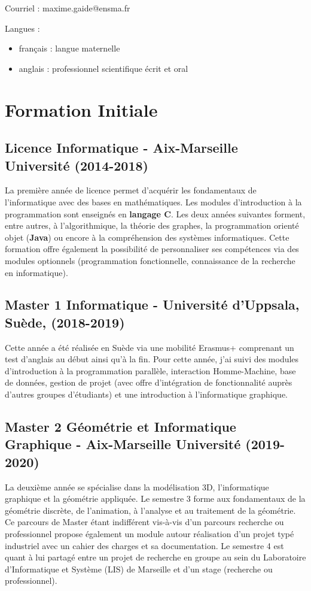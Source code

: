 \documentclass[11pt,a4paper,oneside]{article}
\begin{document}
\noindent Courriel : maxime.gaide@ensma.fr

\noindent Langues :
\begin{itemize}
	\item français : langue maternelle
	\item anglais : professionnel scientifique écrit et oral
\end{itemize}

\section{Formation Initiale}

\subsection{Licence Informatique - Aix-Marseille Université (2014-2018)}

La première année de licence permet d'acquérir les fondamentaux de
l'informatique avec des bases en mathématiques. %
Les modules d'introduction à la programmation sont enseignés en \textbf{langage C}. %
Les deux années suivantes forment, entre autres, à l'algorithmique, la théorie
des graphes, la programmation orienté objet (\textbf{Java}) ou encore à la compréhension
des systèmes informatiques. %
Cette formation offre également la possibilité de personnaliser ses compétences
via des modules optionnels (programmation fonctionnelle, connaissance de la
recherche en informatique). %

\subsection{Master 1 Informatique - Université d'Uppsala, Suède, (2018-2019)}

Cette année a été réalisée en Suède via une mobilité Erasmus+ comprenant un test
d'anglais au début ainsi qu'à la fin. %
Pour cette année, j'ai suivi des modules d'introduction à la programmation
parallèle, interaction Homme-Machine, base de données, gestion de projet (avec
offre d’intégration de fonctionnalité auprès d'autres groupes d'étudiants) et une
introduction à l'informatique graphique. %

\subsection{Master 2 Géométrie et Informatique Graphique - Aix-Marseille Université (2019-2020)}

La deuxième année se spécialise dans la modélisation 3D, l'informatique
graphique et la géométrie appliquée. %
Le semestre 3 forme aux fondamentaux de la géométrie discrète, de l'animation, à
l'analyse et au traitement de la géométrie. %
Ce parcours de Master étant indifférent vis-à-vis d'un parcours recherche ou
professionnel propose également un module autour réalisation d'un projet typé
industriel avec un cahier des charges et sa documentation. %
Le semestre 4 est quant à lui partagé entre un projet de recherche en groupe au sein du Laboratoire d'Informatique et Système (LIS) de Marseille et d'un stage (recherche ou professionnel).
\end{document}
